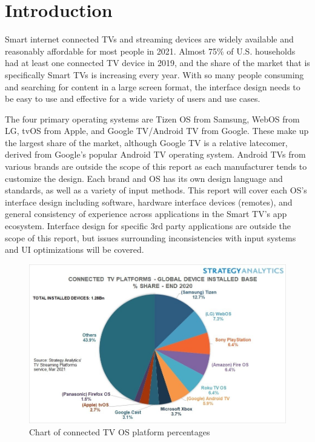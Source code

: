 \documentclass[12pt, letterpaper]{article}
\begin{document}


\newpage
\tableofcontents
\thispagestyle{empty}
\newpage
\section{Introduction}
Smart internet connected TVs and streaming devices are widely available and reasonably affordable for most people in 2021.  Almost 75\% of U.S. households
had at least one connected TV device in 2019, and the share of the market that is specifically Smart TVs is increasing every year\cite{leichtman_research_group_2019}.  With so many people consuming and searching for 
content in a large screen format, the interface design needs to be easy to use and effective for a wide variety of users and use cases.  

The four primary operating systems are Tizen OS from Samsung, WebOS from LG, tvOS from Apple, and Google TV/Android TV from Google.  These make up the largest share of the market, although 
Google TV is a relative latecomer, derived from Google's popular Android TV operating system\cite{alam_khusro_khan_2020}.  Android TVs from various brands are outside the scope of this report as each manufacturer tends to customize the design. Each brand and OS has
its own design language and standards, as well as a variety of input methods.  This report will cover each OS's interface design including software, hardware interface devices (remotes), and general consistency of experience 
across applications in the Smart TV's app ecosystem.  Interface design for specific 3rd party applications are outside the scope of this report, but 
issues surrounding inconsistencies with input systems and UI optimizations will be covered.
\begin{figure}[h]
    \includegraphics[width=\textwidth]{CTV_Platform_Global_IB_0321.jpg}
    \caption{Chart of connected TV OS platform percentages}
\end{figure}
\end{document}
